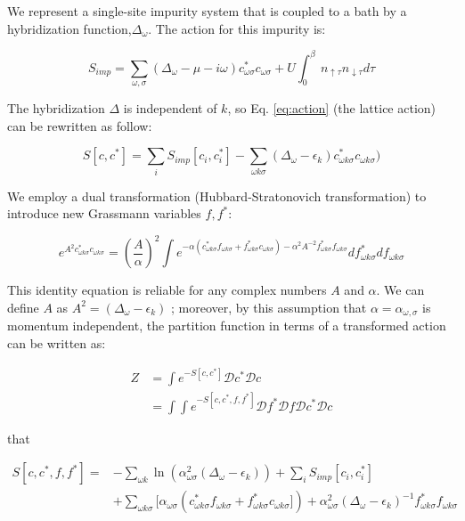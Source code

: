 We represent a single-site impurity system that is coupled to a bath by a hybridization function,$\Delta _\omega$. The action for this impurity is:

\begin{equation}
    S_{imp}= \sum _{\omega, \sigma} (\Delta _\omega - \mu - i\omega)c_{\omega \sigma} ^*c_{\omega \sigma}+ U  \int _0 ^\beta \: n_{\uparrow \tau} n_{\downarrow \tau}d\tau
\end{equation}

The hybridization $\Delta$ is independent of $k$, so Eq. \ref{eq:action} (the lattice action) can be rewritten as follow: 

\begin{equation}
    S[c, c^*]= \sum_i S_{imp} [c_i, c_i ^*] - \sum _{\omega k \sigma} (\Delta _\omega - \epsilon _k )c_{\omega k \sigma} ^*c_{\omega k \sigma})
\end{equation}

\noindent We employ a dual transformation (Hubbard-Stratonovich transformation) to introduce new Grassmann variables $f,f^*$:

\begin{equation}
    e^{A^2 c_{\omega k \sigma} ^*c_{\omega k \sigma}} = \left(\frac{A}{\alpha}\right)^2 \int e^{-\alpha (c_{\omega k \sigma} ^* f_{\omega k \sigma}+f_{\omega k \sigma} ^ * c_{\omega k \sigma})-\alpha^2 A^{-2} f_{\omega k \sigma} ^* f_{\omega k \sigma}} df_{\omega k \sigma} ^* d f_{\omega k \sigma}  
\end{equation}

\noindent This identity equation is reliable for any complex numbers $A$ and $\alpha$. We can define $A$ as $A^2 = (\Delta _\omega - \epsilon _k)$ ; moreover, by this assumption that $\alpha = \alpha _{\omega , \sigma}$ is momentum independent, the partition function in terms of a transformed action can be written as: 

\begin{equation}
\begin{split}
    Z &=\int e^{-S[c, c^*]} \mathcal{D}{c^*} \mathcal{D}{c}\\
    &=\int \int e^{-S[c, c^*,f,f^*]}\mathcal {D}{f^*}\mathcal{D}{f}\mathcal{D}{c^*} \mathcal{D}{c}
    \end{split}
\end{equation}

\noindent that

\begin{equation}
\begin{split}
    S[c, c^*,f,f^*]= &-\sum _{\omega k} \ln(\alpha _{\omega \sigma} ^2 (\Delta _\omega - \epsilon _k))+ \sum _i S_{imp}[c_i, c_i^*]\\
   & +\sum _{\omega k \sigma}[\alpha_{\omega \sigma} (c_{\omega k \sigma} ^* f_{\omega k \sigma}+f_{\omega k \sigma} ^ * c_{\omega k \sigma}])+\alpha _{\omega \sigma} ^2 (\Delta _\omega - \epsilon _k)^{-1} f_{\omega k \sigma} ^ *f_{\omega k \sigma}
   \end{split}
\end{equation}


